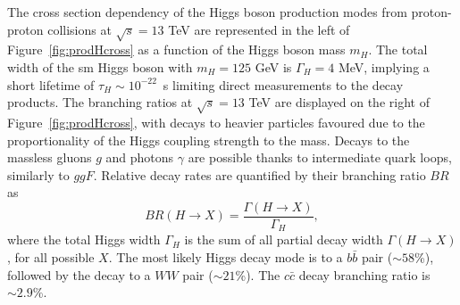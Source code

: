 The cross section dependency of the Higgs boson production modes from proton-proton collisions at $\sqrt{s} = 13$ TeV are represented in the left of Figure~\ref{fig:prodHcross} as a function of the Higgs boson mass $m_H$. The total width of the \gls{sm} Higgs boson with $m_H = 125$ GeV is $\Gamma_H = 4$ MeV, implying a short lifetime of $\tau_H \sim10^{-22}$~s limiting direct measurements to the decay products. The branching ratios at $\sqrt{s} = 13$ TeV are displayed on the right of Figure~\ref{fig:prodHcross}, with decays to heavier particles favoured due to the proportionality of the Higgs coupling strength to the mass. Decays to the massless gluons $g$ and photons $\gamma$ are possible thanks to intermediate quark loops, similarly to $ggF$. Relative decay rates are quantified by their branching ratio $BR$ as
\begin{equation}
    BR (H \rightarrow X) = \frac{\Gamma (H\rightarrow X)}{\Gamma_H},
\end{equation}
where the total Higgs width $\Gamma_H$ is the sum of all partial decay width $\Gamma (H\rightarrow X)$, for all possible $X$. The most likely Higgs decay mode is to a $b\bar{b}$ pair ($\sim58$\%), followed by the decay to a $WW$ pair ($\sim21$\%). The $c\bar{c}$ decay branching ratio is $\sim2.9$\%. \\

